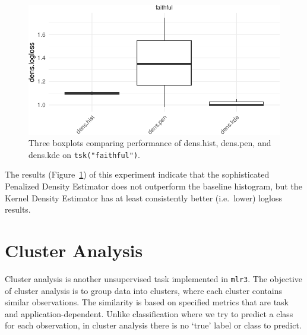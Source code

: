 \begin{Shaded}
\begin{Highlighting}[]
\end{Highlighting}
\end{Shaded}

\begin{figure}

{\centering \includegraphics[width=1\textwidth,height=\textheight]{chapters/chapter13/beyond_regression_and_classification_files/figure-pdf/fig-beyond-density-1.pdf}

}

\caption{\label{fig-beyond-density}Three boxplots comparing performance
of dens.hist, dens.pen, and dens.kde on \texttt{tsk("faithful")}.}

\end{figure}

The results (Figure~\ref{fig-beyond-density}) of this experiment
indicate that the sophisticated Penalized Density Estimator does not
outperform the baseline histogram, but the Kernel Density Estimator has
at least consistently better (i.e.~lower) logloss results.

\hypertarget{sec-cluster}{%
\section{Cluster Analysis}\label{sec-cluster}}

Cluster analysis is another unsupervised task
implemented in \texttt{mlr3}. The objective of cluster analysis is to
group data into clusters, where each cluster contains similar
observations. The similarity is based on specified metrics that are task
and application-dependent. Unlike classification where we try to predict
a class for each observation, in cluster analysis there is no `true'
label or class to predict.

